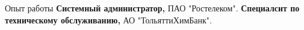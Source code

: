 \begin{rubric}{Опыт работы}
%
	\textbf{Системный администратор,} ПАО "Ростелеком".
%
%
%
	\textbf{Специалсит по техническому обслуживанию,} АО "ТольяттиХимБанк".
%
\end{rubric}